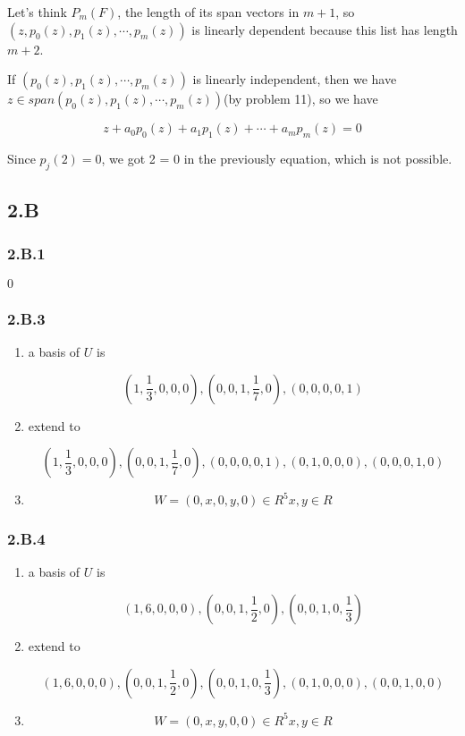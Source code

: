 Let's think $P_{m}(F)$, the length of its span vectors in $m+1$, so $(z, p_{0}(z), p_{1}(z), \cdots, p_{m}(z))$ is linearly dependent because this list has length $m+2$. 

If $(p_{0}(z), p_{1}(z), \cdots, p_{m}(z))$ is linearly independent, then we have $z\in span(p_{0}(z), p_{1}(z), \cdots, p_{m}(z))$(by problem 11), so we have

\[z+a_{0}p_{0}(z) + a_{1}p_{1}(z) +\cdots + a_{m}p_{m}(z) = 0\]

Since $p_{j}(2) = 0$, we got 2 = 0 in the previously equation, which is not possible.

\subsection*{2.B}
\subsubsection*{2.B.1}

${0}$

\subsubsection*{2.B.3}

\begin{enumerate}[label=(\alph*)]
\item a basis of $U$ is

\[(1, \frac{1}{3}, 0, 0, 0), (0, 0, 1, \frac{1}{7}, 0), (0, 0, 0, 0, 1)\]

\item extend to 

\[(1, \frac{1}{3}, 0, 0, 0), (0, 0, 1, \frac{1}{7}, 0), (0, 0, 0, 0, 1), (0, 1, 0, 0, 0), (0, 0, 0, 1, 0)\]

\item 

\[W = {(0, x, 0, y, 0) \in R^{5} x, y \in R}\]

\end{enumerate}

\subsubsection*{2.B.4}

\begin{enumerate}[label=(\alph*)]
\item a basis of $U$ is

\[(1, 6, 0, 0, 0), (0, 0, 1, \frac{1}{2}, 0), (0, 0, 1, 0, \frac{1}{3})\]

\item extend to 

\[(1, 6, 0, 0, 0), (0, 0, 1, \frac{1}{2}, 0), (0, 0, 1, 0, \frac{1}{3}), (0, 1, 0, 0, 0), (0, 0, 1, 0, 0)\]

\item 

\[W = {(0, x, y, 0, 0) \in R^{5} x, y \in R}\]

\end{enumerate}

